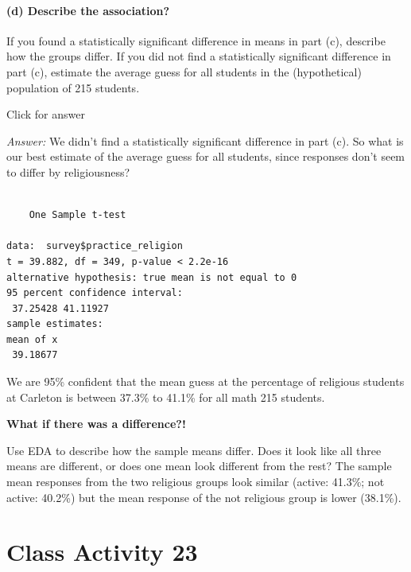 \documentclass[
]{book}
\newenvironment{Shaded}{\begin{snugshade}}{\end{snugshade}}
\newcommand{\FunctionTok}[1]{\textcolor[rgb]{0.00,0.00,0.00}{#1}}
\newcommand{\NormalTok}[1]{#1}
\newcommand{\SpecialCharTok}[1]{\textcolor[rgb]{0.00,0.00,0.00}{#1}}
\begin{document}
\hypertarget{d-describe-the-association}{%
\subsubsection{(d) Describe the association?}\label{d-describe-the-association}}

If you found a statistically significant difference in means in part (c), describe how the groups differ. If you did not find a statistically significant difference in part (c), estimate the average guess for all students in the (hypothetical) population of 215 students.

Click for answer

\emph{Answer:} We didn't find a statistically significant difference in part (c). So what is our best estimate of the average guess for all students, since responses don't seem to differ by religiousness?

\begin{Shaded}
\end{Shaded}

\begin{verbatim}

    One Sample t-test

data:  survey$practice_religion
t = 39.882, df = 349, p-value < 2.2e-16
alternative hypothesis: true mean is not equal to 0
95 percent confidence interval:
 37.25428 41.11927
sample estimates:
mean of x 
 39.18677 
\end{verbatim}

We are 95\% confident that the mean guess at the percentage of religious students at Carleton is between 37.3\% to 41.1\% for all math 215 students.

\textbf{What if there was a difference?!}

Use EDA to describe how the sample means differ. Does it look like all three means are different, or does one mean look different from the rest? The sample mean responses from the two religious groups look similar (active: 41.3\%; not active: 40.2\%) but the mean response of the not religious group is lower (38.1\%).

\hypertarget{class-activity-23}{%
\chapter{Class Activity 23}\label{class-activity-23}}
\end{document}
